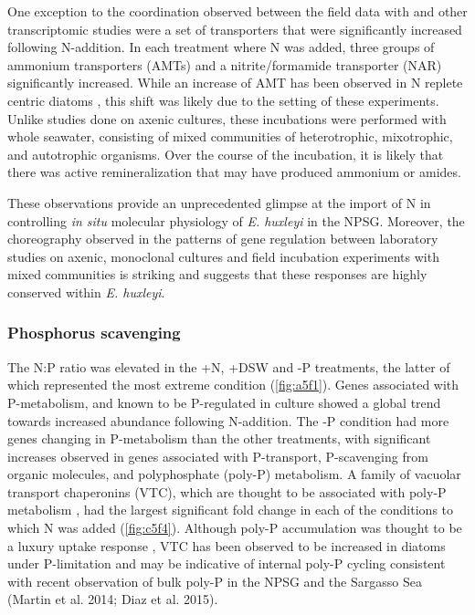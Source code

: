 One exception to the coordination observed between the field data with \citet{McKew2015} and other transcriptomic studies \citep{Dyhrman2006, Rokitta2014} were a set of transporters that were significantly increased following N-addition. In each treatment where N was added, three groups of ammonium transporters (AMTs) and a nitrite/formamide transporter (NAR) significantly increased. While an increase of AMT has been observed in N replete centric diatoms \citep{Bender2014}, this shift was likely due to the setting of these experiments. Unlike studies done on axenic cultures, these incubations were performed with whole seawater, consisting of mixed communities of heterotrophic, mixotrophic, and autotrophic organisms. Over the course of the incubation, it is likely that there was active remineralization \citep{Casciotti2008} that may have produced ammonium or amides. \par

These observations provide an unprecedented glimpse at the import of N in controlling \textit{in situ} molecular physiology of \textit{E. huxleyi} in the NPSG. Moreover, the choreography observed in the patterns of gene regulation between laboratory studies on axenic, monoclonal cultures and field incubation experiments with mixed communities is striking and suggests that these responses are highly conserved within \textit{E. huxleyi}. \par


\subsubsection{Phosphorus scavenging}

The N:P ratio was elevated in the +N, +DSW and -P treatments, the latter of which represented the most extreme condition (\cref{fig:a5f1}). Genes associated with P-metabolism, and known to be P-regulated in culture \citep{Dyhrman2006, McKew2015} showed a global trend towards increased abundance following N-addition. The -P condition had more genes changing in P-metabolism than the other treatments, with significant increases observed in genes associated with P-transport, P-scavenging from organic molecules, and polyphosphate (poly-P) metabolism. A family of vacuolar transport chaperonins (VTC), which are thought to be associated with poly-P metabolism \citep{Ogawa2000, Hothorn2009, Dyhrman2012}, had the largest significant fold change in each of the conditions to which N was added (\cref{fig:c5f4}). Although poly-P accumulation was thought to be a luxury uptake response \citep{Perry1976}, VTC has been observed to be increased in diatoms under P-limitation \citep{Dyhrman2006, Dyhrman2012} and may be indicative of internal poly-P cycling consistent with recent observation of bulk poly-P in the NPSG and the Sargasso Sea (Martin et al. 2014; Diaz et al. 2015). \par


